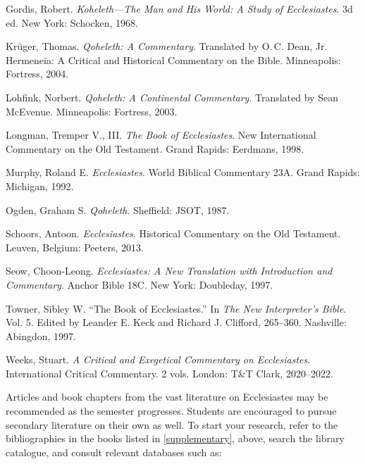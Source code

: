 \documentclass[titlepage]{article}
\begin{document}
\begin{thebibliography}{99}
 Gordis, Robert. \emph{Koheleth—The Man and His World: A Study of Ecclesiastes}. 3d ed. New York: Schocken, 1968.

 Krüger, Thomas. \emph{Qoheleth: A Commentary}. Translated by O.\,C. Dean, Jr. Hermeneia: A Critical and Historical Commentary on the Bible. Minneapolis: Fortress, 2004.

 Lohfink, Norbert. \emph{Qoheleth: A Continental Commentary}. Translated by Sean McEvenue. Minneapolis: Fortress, 2003.

 Longman, Tremper V., III. \emph{The Book of Ecclesiastes}. New International Commentary on the Old Testament. Grand Rapids: Eerdmans, 1998.

 Murphy, Roland E. \emph{Ecclesiastes}. World Biblical Commentary 23A. Grand Rapids: Michigan, 1992.

 Ogden, Graham S. \emph{Qoheleth}. Sheffield: JSOT, 1987.

 Schoors, Antoon. \emph{Ecclesiastes}. Historical Commentary on the Old Testament. Leuven, Belgium: Peeters, 2013.

 Seow, Choon-Leong. \emph{Ecclesiastes: A New Translation with Introduction and Commentary}. Anchor Bible 18C. New York: Doubleday, 1997.

 Towner, Sibley W. “The Book of Ecclesiastes.” In \emph{The New Interpreter’s Bible}. Vol. 5. Edited by Leander E. Keck and Richard J. Clifford, 265–360. Nashville: Abingdon, 1997.

 Weeks, Stuart. \emph{A Critical and Exegetical Commentary on Ecclesiastes}. International Critical Commentary. 2 vols. London: T\&T Clark, 2020–2022.

\end{thebibliography}
\endgroup



Articles and book chapters from the vast literature on Ecclesiastes may
be recommended as the semester progresses. Students are encouraged to
pursue secondary literature on their own as well. To start your
research, refer to the bibliographies in the books listed in
\autoref{supplementary}, above, search the library catalogue, and
consult relevant databases such as:
\end{document}
